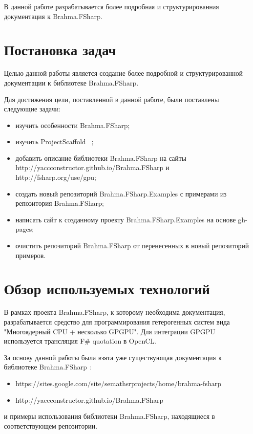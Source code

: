 \documentclass[14pt]{matmex-diploma}
\begin{document}
В данной работе разрабатывается более подробная и структурированная документация к Brahma.FSharp.

\section{Постановка задач}
Целью данной работы является создание более подробной и структурированной документации к библиотеке Brahma.FSharp.
 
Для достижения цели, поставленной в данной работе, были поставлены следующие задачи: 

\begin{itemize}
\item изучить особенности Brahma.FSharp;
\item изучить ProjectScaffold ~\cite{prscaffold};
\item добавить описание библиотеки Brahma.FSharp на сайты 
      \linebreak http://yaccconstructor.github.io/Brahma.FSharp и
      \linebreak http://fsharp.org/use/gpu;
\item создать новый репозиторий Brahma.FSharp.Examples с примерами из репозитория Brahma.FSharp;
\item написать сайт к созданному проекту Brahma.FSharp.Examples   на основе gh-pages;
\item очистить репозиторий Brahma.FSharp от перенесенных в новый репозиторий примеров.
\end{itemize}

\section {Обзор используемых технологий}
В рамках проекта Brahma.FSharp, к которому необходима документация,  разрабатывается средство для программирования гетерогенных систем вида "Многоядерный CPU + несколько GPGPU". Для интеграции GPGPU используется трансляция F\# quotation в OpenCL. 
 
За основу данной работы была взята уже существующая документация к библиотеке Brahma.FSharp : 
\begin{itemize}
\item https://sites.google.com/site/semathsrprojects/home/brahma-fsharp
\item http://yaccconstructor.github.io/Brahma.FSharp
\end{itemize}
и примеры использования библиотеки Brahma.FSharp, находящиеся в соответствующем репозитории.
 
\end{document}
